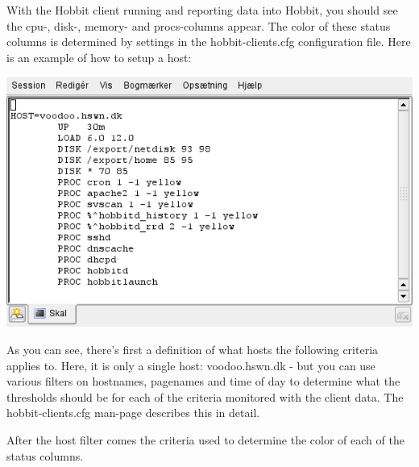  With the Hobbit client running and reporting data into Hobbit, you should see the cpu-, disk-, memory- and procs-columns appear. The color of these status columns is determined by settings in the  hobbit-clients.cfg configuration file. Here is an example of how to setup a host:


 \includegraphics[scale=1]{./hobbit-clients.png} 


 As you can see, there's first a definition of what hosts the following criteria applies to. Here, it is only a single host: voodoo.hswn.dk - but you can use various filters on hostnames, pagenames and time of day to determine what the thresholds should be for each of the criteria monitored with the client data. The hobbit-clients.cfg man-page describes this in detail.


 After the host filter comes the criteria used to determine the color of each of the status columns.


